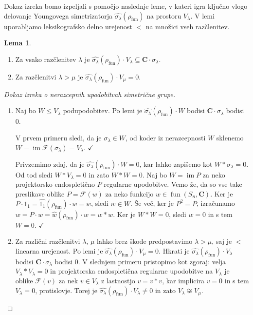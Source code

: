 \documentclass[11pt]{book}
\def\CC{\mathbf{C}}
\def\Fcal{\mathcal{F}}
\def\youngsym{\sigma_{\lambda}}
\DeclareMathOperator\image{im}
\DeclareMathOperator\fun{fun}
\def\kljuka{$\checkmark$}
\theoremstyle{definition}
\theoremstyle{zgled}
\theoremstyle{odprtproblem}
\theoremstyle{domacanaloga}
\newenvironment{dokaz}
    {\color{siva}\begin{proof}}
    {\end{proof}}
\theoremstyle{izrek}
\newtheorem*{lema}{Lema}
\begin{document}
Dokaz izreka bomo izpeljali s pomočjo naslednje leme, v kateri igra ključno vlogo delovanje Youngovega simetrizatorja $\widehat{\youngsym}(\rho_{\fun})$ na prostoru $V_{\lambda}$. V lemi uporabljamo leksikografsko delno urejenost $<$ na množici vseh razčlenitev. 

\begin{lema} \leavevmode
\begin{enumerate}
    \item Za vsako razčlenitev $\lambda$ je $\widehat{\youngsym}(\rho_{\fun}) \cdot V_{\lambda} \subseteq \CC \cdot \youngsym$.
    \item Za razčlenitvi $\lambda > \mu$ je $\widehat{\youngsym}(\rho_{\fun}) \cdot V_{\mu} = 0$.
\end{enumerate}
\end{lema}

\begin{dokaz}[Dokaz izreka o nerazcepnih upodobitvah simetrične grupe] \leavevmode
\begin{enumerate}
    \item Naj bo $W \leq V_{\lambda}$ podupodobitev. Po lemi je $\widehat{\youngsym}(\rho_{\fun}) \cdot W$ bodisi $\CC \cdot \youngsym$ bodisi $0$. 
    
    V prvem primeru sledi, da je $\youngsym \in W$, od koder iz nerazcepnosti $W$ sklenemo $W = \image \Fcal(\youngsym) = V_{\lambda}$. \kljuka
    
    Privzemimo zdaj, da je $\widehat{\youngsym}(\rho_{\fun}) \cdot W = 0$, kar lahko zapišemo kot $W * \youngsym = 0$. Od tod sledi $W * V_{\lambda} = 0$ in zato $W * W = 0$. Naj bo $W = \image P$ za neko projektorsko endospletično $P$ regularne upodobitve. Vemo že, da so vse take preslikave oblike $P = \Fcal(w)$ za neko funkcijo $w \in \fun(S_n, \CC)$. Ker je $P \cdot 1_1 = \widehat{1_1}(\rho_{\fun}) \cdot w = w$, sledi $w \in W$. Še več, ker je $P^2 = P$, izračunamo $w = P \cdot w = \widehat{w}(\rho_{\fun}) \cdot w = w * w$. Ker je $W * W = 0$, sledi $w = 0$ in s tem $W = 0$. \kljuka

    \item Za različni razčlenitvi $\lambda$, $\mu$ lahko brez škode predpostavimo $\lambda > \mu$, saj je $<$ linearna urejenost. Po lemi je $\widehat{\youngsym}(\rho_{\fun}) \cdot V_{\mu} = 0$. Hkrati je $\widehat{\youngsym}(\rho_{\fun}) \cdot V_{\lambda}$ bodisi $\CC \cdot \youngsym$ bodisi $0$. V slednjem primeru pristopimo kot zgoraj: velja $V_{\lambda} * V_{\lambda} = 0$ in projektorska endospletična regularne upodobitve na $V_{\lambda}$ je oblike $\Fcal(v)$ za nek $v \in V_{\lambda}$ z lastnostjo $v = v * v$, kar implicira $v = 0$ in s tem $V_{\lambda} = 0$, protislovje. Torej je $\widehat{\youngsym}(\rho_{\fun}) \cdot V_{\lambda} \neq 0$ in zato $V_{\lambda} \not\cong V_{\mu}$.
\end{enumerate}
\end{dokaz}
\end{document}
